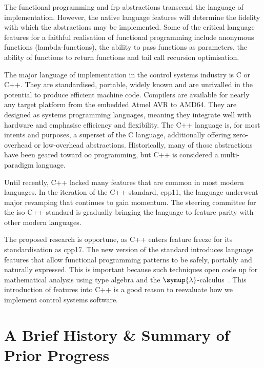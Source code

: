 The functional programming and \ac{frp} abstractions transcend the language of
implementation. However, the native language features will determine the
fidelity with which the abstractions may be implemented. Some of the critical
language features for a faithful realisation of functional programming include
anonymous functions (lambda-functions), the ability to pass functions as
parameters, the ability of functions to return functions and tail call recursion
optimisation.

 The major language of implementation in the
control systems industry is C or C++. They are standardised, portable, widely
known and are unrivalled in the potential to produce efficient machine code.
Compilers are available for nearly any target platform from the embedded Atmel
AVR to AMD64. They are designed as systems programming languages, meaning they
integrate well with hardware and emphasise efficiency and flexibility. The C++
language is, for most intents and purposes, a superset of the C language,
additionally offering zero-overhead or low-overhead abstractions. Historically,
many of those abstractions have been geared toward \ac{oo} programming, but C++
is considered a multi-paradigm language.

Until recently, C++ lacked many features that are common in most modern
languages. In the  iteration of the C++ standard, \ac{cpp11}, the
language underwent major revamping that continues to gain momentum. The steering
committee for the \ac{iso} C++ standard is gradually bringing the language to
feature parity with other modern languages.

The proposed research is opportune, as C++ enters feature freeze for its
 standardisation as \ac{cpp17}. The new version of the standard
introduces language features that allow functional programming patterns to be
safely, portably and naturally expressed. This is important because such
techniques open code up for mathematical analysis using type algebra and the
$\symup{\lambda}$-calculus~\cite{Church1941}. This introduction of features into
C++ is a good reason to reevaluate how we implement control systems software.



\section{A Brief History \& Summary of Prior Progress}%
\label{sec:historyANDprogress}


